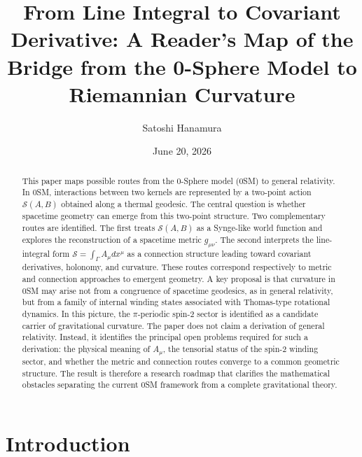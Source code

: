 \documentclass[%
 reprint, amsmath,amssymb, aps, prb, ]{revtex4-2}
\numberwithin{equation}{section}
\begin{document}
\title{From Line Integral to Covariant Derivative: A Reader's Map of the Bridge from the 0-Sphere Model to Riemannian Curvature}

\author{Satoshi Hanamura}

\date{June 20, 2026}

\begin{abstract}
This paper maps possible routes from the 0-Sphere model (0SM) to general relativity. In 0SM, interactions between two kernels are represented by a two-point action $\mathcal{S}(A,B)$ obtained along a thermal geodesic. The central question is whether spacetime geometry can emerge from this two-point structure. Two complementary routes are identified. The first treats $\mathcal{S}(A,B)$ as a Synge-like world function and explores the reconstruction of a spacetime metric $g_{\mu\nu}$. The second interprets the line-integral form $\mathcal{S}=\int_{\Gamma}A_{\mu}dx^{\mu}$ as a connection structure leading toward covariant derivatives, holonomy, and curvature. These routes correspond respectively to metric and connection approaches to emergent geometry. A key proposal is that curvature in 0SM may arise not from a congruence of spacetime geodesics, as in general relativity, but from a family of internal winding states associated with Thomas-type rotational dynamics. In this picture, the $\pi$-periodic spin-2 sector is identified as a candidate carrier of gravitational curvature. The paper does not claim a derivation of general relativity. Instead, it identifies the principal open problems required for such a derivation: the physical meaning of $A_{\mu}$, the tensorial status of the spin-2 winding sector, and whether the metric and connection routes converge to a common geometric structure. The result is therefore a research roadmap that clarifies the mathematical obstacles separating the current 0SM framework from a complete gravitational theory.
\end{abstract}

\maketitle

\section{Introduction}
\label{sec:intro}
\end{document}
